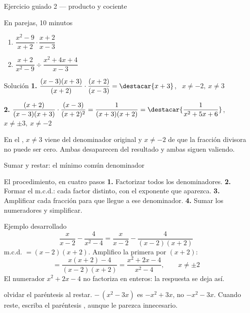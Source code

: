 \documentclass[aspectratio=169,10pt]{beamer}
\begin{document}
\begin{frame}{Ejercicio guiado 2 — producto y cociente}
  \scriptsize
  \begin{alertblock}{En parejas, 10 minutos}
    \scriptsize
    \begin{enumerate}\setlength{\itemsep}{0.06cm}
      \item $\dfrac{x^{2}-9}{x+2}\cdot\dfrac{x+2}{x-3}$
      \item $\dfrac{x+2}{x^{2}-9}\div\dfrac{x^{2}+4x+4}{x-3}$
    \end{enumerate}
  \end{alertblock}

  \vspace{0.1cm}
  \begin{block}{Solución}
    \tiny
    \textbf{1.} $\dfrac{(x-3)(x+3)}{(x+2)}\cdot\dfrac{(x+2)}{(x-3)}
    = \destacar{x+3}$, \ $x\neq -2,\ x\neq 3$

    \vspace{0.1cm}
    \textbf{2.} $\dfrac{(x+2)}{(x-3)(x+3)}\cdot\dfrac{(x-3)}{(x+2)^{2}}
    = \dfrac{1}{(x+3)(x+2)}
    = \destacar{\dfrac{1}{x^{2}+5x+6}}$, \ $x\neq \pm 3,\ x\neq -2$
  \end{block}

  \vspace{0.06cm}
  {\tiny\color{uniGris} En el , $x\neq 3$ viene del denominador
  original y $x\neq -2$ de que la fracción divisora no puede ser cero. Ambas
  desaparecen del resultado y ambas siguen valiendo.}
\end{frame}

\begin{frame}{Sumar y restar: el mínimo común denominador}
  \scriptsize
  \begin{block}{El procedimiento, en cuatro pasos}
    \tiny
    \textbf{1.} Factorizar todos los denominadores. \quad
    \textbf{2.} Formar el m.c.d.: cada factor distinto, con el 
    exponente que aparezca. \quad
    \textbf{3.} Amplificar cada fracción para que llegue a ese denominador.
    \quad
    \textbf{4.} Sumar  los numeradores y simplificar.
  \end{block}

  \vspace{0.1cm}
  \begin{exampleblock}{Ejemplo desarrollado}
    \tiny
    \[ \frac{x}{x-2}-\frac{4}{x^{2}-4}
     = \frac{x}{x-2}-\frac{4}{(x-2)(x+2)} \]
    m.c.d. $=(x-2)(x+2)$. Amplifico la primera por $(x+2)$:
    \[ = \frac{x(x+2)-4}{(x-2)(x+2)}
       = \frac{x^{2}+2x-4}{x^{2}-4}, \qquad x\neq \pm 2 \]
    El numerador $x^{2}+2x-4$ no factoriza en enteros: la respuesta se deja
    así.
  \end{exampleblock}

  \vspace{0.06cm}
  {\tiny\color{uniGris}  olvidar el paréntesis al
  restar. $-\,(x^{2}-3x)$ es $-x^{2}+3x$, no $-x^{2}-3x$. Cuando reste, escriba
  el paréntesis , aunque le parezca innecesario.}
\end{frame}
\end{document}
